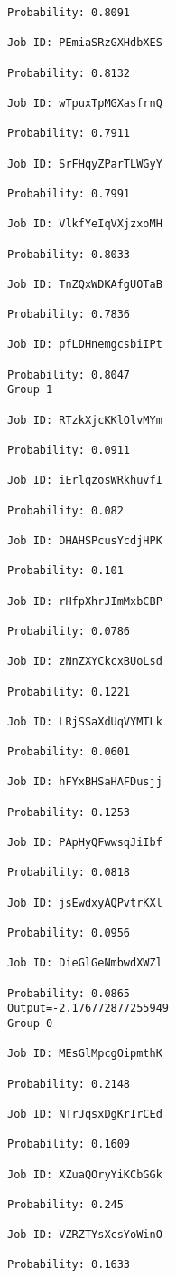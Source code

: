\documentclass[11pt]{article}
\begin{document}
\begin{Verbatim}[commandchars=\\\{\}]
Probability: 0.8091

Job ID: PEmiaSRzGXHdbXES

Probability: 0.8132

Job ID: wTpuxTpMGXasfrnQ

Probability: 0.7911

Job ID: SrFHqyZParTLWGyY

Probability: 0.7991

Job ID: VlkfYeIqVXjzxoMH

Probability: 0.8033

Job ID: TnZQxWDKAfgUOTaB

Probability: 0.7836

Job ID: pfLDHnemgcsbiIPt

Probability: 0.8047
Group 1

Job ID: RTzkXjcKKlOlvMYm

Probability: 0.0911

Job ID: iErlqzosWRkhuvfI

Probability: 0.082

Job ID: DHAHSPcusYcdjHPK

Probability: 0.101

Job ID: rHfpXhrJImMxbCBP

Probability: 0.0786

Job ID: zNnZXYCkcxBUoLsd

Probability: 0.1221

Job ID: LRjSSaXdUqVYMTLk

Probability: 0.0601

Job ID: hFYxBHSaHAFDusjj

Probability: 0.1253

Job ID: PApHyQFwwsqJiIbf

Probability: 0.0818

Job ID: jsEwdxyAQPvtrKXl

Probability: 0.0956

Job ID: DieGlGeNmbwdXWZl

Probability: 0.0865
Output=-2.176772877255949
Group 0

Job ID: MEsGlMpcgOipmthK

Probability: 0.2148

Job ID: NTrJqsxDgKrIrCEd

Probability: 0.1609

Job ID: XZuaQOryYiKCbGGk

Probability: 0.245

Job ID: VZRZTYsXcsYoWinO

Probability: 0.1633


\end{Verbatim}
\end{document}
